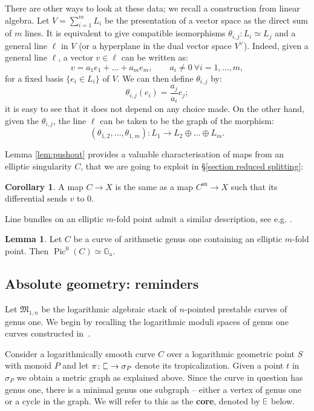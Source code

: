 \documentclass[11pt]{amsart}
\DeclareRobustCommand{\plE}{\text{\reflectbox{$\exists$}}}
\newcommand{\plC}{\scalebox{0.8}[1.3]{$\sqsubset$}}
\renewcommand{\to}{\rightarrow}
\theoremstyle{definition}
\newtheorem{lemma}[thm]{Lemma}
\newtheorem{cor}[thm]{Corollary}
\theoremstyle{definition}
\begin{document}
There are other ways to look at these data; we recall a construction from linear algebra. Let $V=\sum_{i=1}^mL_i$ be the presentation of a vector space as the direct sum of $m$ lines. It is equivalent to give compatible isomorphisms $\theta_{i,j}\colon L_i\simeq L_j$ and a general line $\ell$ in $V$ (or a hyperplane in the dual vector space $V^\vee$). Indeed, given a general line $\ell$, a vector $v\in\ell$ can be written as:
\[v=a_1e_1+\ldots+a_me_m,\qquad a_i\neq 0\ \forall i=1,\ldots,m,\]
for a fixed basis $\{e_i\in L_i\}$ of $V$. We can then define $\theta_{i,j}$ by:
\[\theta_{i,j}(e_i)=\frac{a_j}{a_i}e_j;\]
it is easy to see that it does not depend on any choice made. On the other hand, given the $\theta_{i,j}$, the line $\ell$ can be taken to be the graph of the morphism:
\[(\theta_{1,2},\ldots,\theta_{1,m})\colon L_1\to L_2\oplus\ldots\oplus L_m.\]

Lemma \ref{lem:pushout} provides a valuable characterisation of maps from an elliptic singularity $C$, that we are going to exploit in \S \ref{section reduced splitting}:
\begin{cor}\label{cor:maps_from_elliptic_sing}
 A map $C\to X$ is the same as a map $C^\text{sn}\to X$ such that its differential sends $v$ to $0$.
\end{cor}

Line bundles on an elliptic $m$-fold point admit a similar description, see e.g. \cite[Lemma 7.5.12]{LiuQ}.
\begin{lemma}\label{lem:PicE}
 Let $C$ be a curve of arithmetic genus one containing an elliptic $m$-fold point. Then $\operatorname{Pic}^0(C)\simeq\mathbb G_{\text{a}}$.
\end{lemma}


\subsection{Absolute geometry: reminders} Let $\mathfrak M_{1,n}$ be the logarithmic algebraic stack of $n$-pointed prestable curves of genus one. We begin by recalling the logarithmic moduli spaces of genus one curves constructed in~\cite[\S 2 \& \S 4]{RSPW}. 

Consider a logarithmically smooth curve $C$ over a logarithmic geometric point $S$ with monoid $P$ and let $\pi\colon \plC\to \sigma_P$ denote its tropicalization. Given a point $t$ in $\sigma_P$ we obtain a metric graph as explained above. Since the curve in question has genus one, there is a minimal genus one subgraph -- either a vertex of genus one or a cycle in the graph. We will refer to this as the \textbf{core}, denoted by $\plE$ below.
\end{document}
